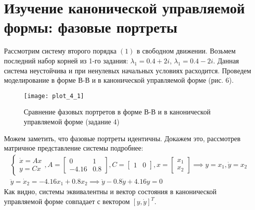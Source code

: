 \pagebreak

\section{Изучение канонической управляемой формы: фазовые портреты}
Рассмотрим систему второго порядка $(1)$ в свободном движении. Возьмем последний набор корней из 1-го задания:
$\lambda_1 = 0.4 + 2 i$, $\lambda_1 = 0.4 - 2 i$. Данная система неустойчива и при ненулевых начальных условиях
расходится. Проведем моделирование в форме В-В и в канонической управляемой форме (рис. 6).
\begin{figure}[h]
    \centering
    \texttt{[image: plot\_4\_1]}
    \caption{\label{fig:The-caption-1}Сравнение фазовых портретов в форме В-В и в канонической
    управляемой форме (задание 4)}
\end{figure}

Можем заметить, что фазовые портреты идентичны. Докажем это, рассмотрев матричное 
представление системы подробнее:
\begin{gather*}
    \begin{cases}
        \dot x = Ax  \\
        y = Cx
    \end{cases}, 
    A = \begin{bmatrix}
        0 & 1 \\
        -4.16 & 0.8
    \end{bmatrix},
    C = \begin{bmatrix}
        1 & 0 
    \end{bmatrix},
    x = \begin{bmatrix}
        x_1 \\
        x_2
    \end{bmatrix} \implies y = x_1, \dot y = x_2\\
    \ddot y = \dot x_2 = -4.16 x_1 + 0.8 x_2 \implies \ddot y -0.8\dot y + 4.16y =0
\end{gather*}
Как видно, системы эквивалентны и вектор состояния в канонической управляемой форме совпадает с вектором $[y, \dot y]^T$.
\pagebreak

